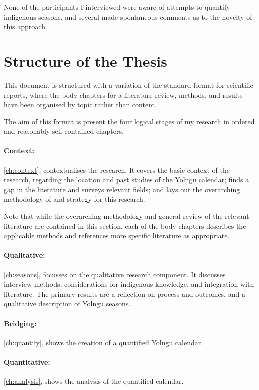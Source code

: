 None of the participants I interviewed were aware of attempts to quantify indigenous seasons,
and several made spontaneous comments as to the novelty of this approach.





\section{Structure of the Thesis}

This document is structured with a variation of the standard format for scientific reports,
where the body chapters for a literature review, methods, and results
have been organised by topic rather than content.

The aim of this format is present the four logical stages of my research
in ordered and reasonably self-contained chapters.

\paragraph{Context:}
\autoref{ch:context}, \textit{} contextualises the research.
It covers the basic context of the research,
regarding the location and past studies of the Yolngu calendar;
finds a gap in the literature and surveys relevant fields;
and lays out the overarching methodology of and strategy for this research.

Note that while the overarching methodology and general review of the relevant literature
are contained in this section, each of the body chapters describes the applicable methods
and references more specific literature as appropriate.


\paragraph{Qualitative:}
\autoref{ch:seasons}, \textit{} focusses on the qualitative research component.
It discusses interview methods, considerations for indigenous knowledge, and integration with literature.
The primary results are a reflection on process and outcomes,
and a qualitative description of Yolngu seasons.


\paragraph{Bridging:}
\autoref{ch:quantify}, \textit{} shows the creation of a quantified Yolngu calendar.


\paragraph{Quantitative:}
\autoref{ch:analysis}, \textit{} shows the analysis of the quantified calendar.

